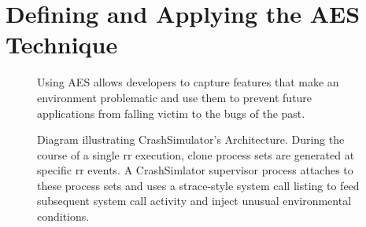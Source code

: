 \section{Defining and Applying the AES Technique}
\label{SEC:approach}

\begin{figure}[t]
  \center{}
  \caption{Using AES allows developers to capture features that make an
    environment problematic and use them to prevent future applications
    from falling victim to the bugs of the past.}
  \label{figure:approach}
\end{figure}

\begin{figure}[t]
  \center{}
  \caption{Diagram illustrating CrashSimulator's Architecture.  During the
    course of a single rr execution, clone process sets are generated at
    specific rr events.  A CrashSimlator supervisor process attaches to
    these process sets and uses a strace-style system call listing to feed
    subsequent system call activity and inject unusual environmental
    conditions.}
  \label{figure:architecture}
\end{figure}


